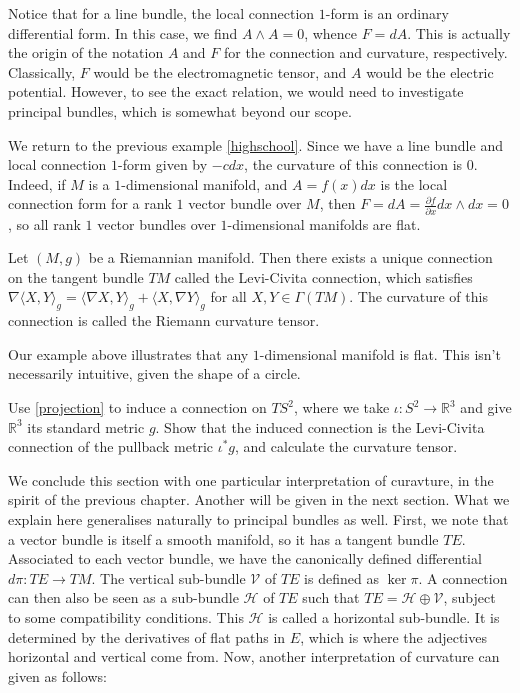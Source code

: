 Notice that for a line bundle, the local connection $1$-form is an ordinary differential form. In this case, we find $A\wedge A=0$, whence $F=dA$. This is actually the origin of the notation $A$ and $F$ for the connection and curvature, respectively. Classically, $F$ would be the electromagnetic tensor, and $A$ would be the electric potential. However, to see the exact relation, we would need to investigate principal bundles, which is somewhat beyond our scope.
\begin{example}
  We return to the previous example \ref{highschool}. Since we have a line bundle and local connection $1$-form given by $-cdx$, the curvature of this connection is $0$. Indeed, if $M$ is a $1$-dimensional manifold, and $A=f(x)dx$ is the local connection form for a rank $1$ vector bundle over $M$, then $F=dA=\frac{\partial f}{\partial x}dx\wedge dx=0$, so all rank $1$ vector bundles over $1$-dimensional manifolds are flat.
\end{example}
\begin{theorem}
  Let $(M,g)$ be a Riemannian manifold. Then there exists a unique connection on the tangent bundle $TM$ called the Levi-Civita connection, which satisfies $\nabla\langle X,Y\rangle_g=\langle\nabla X,Y\rangle_g+\langle X,\nabla Y\rangle_g$ for all $X,Y\in\Gamma(TM)$. The curvature of this connection is called the Riemann curvature tensor.
\end{theorem}
Our example above illustrates that any $1$-dimensional manifold is flat. This isn't necessarily intuitive, given the shape of a circle.
\begin{exercise}
  Use \ref{projection} to induce a connection on $TS^2$, where we take $\iota:S^2\to\mathbb{R}^3$ and give $\mathbb{R}^3$ its standard metric $g$. Show that the induced connection is the Levi-Civita connection of the pullback metric $\iota^*g$, and calculate the curvature tensor.
\end{exercise}
We conclude this section with one particular interpretation of curavture, in the spirit of the previous chapter. Another will be given in the next section. What we explain here generalises naturally to principal bundles as well. First, we note that a vector bundle is itself a smooth manifold, so it has a tangent bundle $TE$. Associated to each vector bundle, we have the canonically defined differential $d\pi:TE\to TM$. The vertical sub-bundle $\mathcal{V}$ of $TE$ is defined as $\ker\pi$. A connection can then also be seen as a sub-bundle $\mathcal{H}$ of $TE$ such that $TE=\mathcal{H}\oplus\mathcal{V}$, subject to some compatibility conditions. This $\mathcal{H}$ is called a horizontal sub-bundle. It is determined by the derivatives of flat paths in $E$, which is where the adjectives horizontal and vertical come from. Now, another interpretation of curvature can given as follows:
